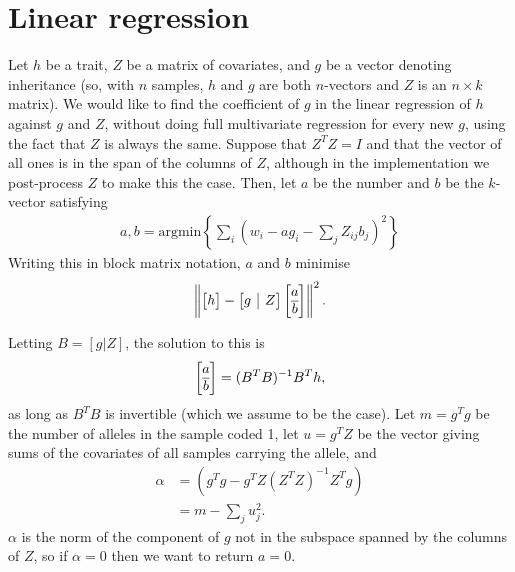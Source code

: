 \documentclass{article}
\begin{document}
\clearpage
\appendix
\setcounter{table}{0}
\renewcommand{\thetable}{S\arabic{table}}
\setcounter{figure}{0}
\renewcommand{\thefigure}{S\arabic{figure}}




\appendix

\section{Linear regression}

Let $h$ be a trait, $Z$ be a matrix of covariates, and $g$ be a vector denoting inheritance
(so, with $n$ samples, $h$ and $g$ are both $n$-vectors and $Z$ is an $n \times k$ matrix).
We would like to find the coefficient of $g$ in the linear regression of $h$ against $g$ and $Z$,
without doing full multivariate regression for every new $g$,
using the fact that $Z$ is always the same.
Suppose that $Z^T Z = I$ and that the vector of all ones is in the span of the columns of $Z$,
although in the implementation we post-process $Z$ to make this the case.
Then, let $a$ be the number and $b$ be the $k$-vector satisfying
\begin{align*}
    a, b = \text{argmin}\left\{ \sum_i \left( w_i - a g_i - \sum_j Z_{ij} b_j \right)^2 \right\}
\end{align*}
Writing this in block matrix notation, $a$ and $b$ minimise
\begin{align*}
    \left\| 
        \left[ \begin{array}{@{}c@{}} h \end{array}\right]
            - 
        \left[ \begin{array}{@{}c|c@{}} g & Z \end{array} \right]
            \left[ \begin{array}{@{}c@{}} a \\ \hline b \end{array} \right]
    \right\|^2 .
\end{align*}


Letting $B = [g | Z]$, the solution to this is
\begin{align*}
    \left[\begin{array}{@{}c@{}}a\\\hline b\end{array}\right] 
        = (B^T B)^{-1} B^T h ,
\end{align*}
as long as $B^T B$ is invertible (which we assume to be the case).
Let $m = g^T g$ be the number of alleles in the sample coded 1,
let $u = g^T Z$ be the vector giving sums of the covariates of all samples carrying the allele,
and
\begin{align*}
    \alpha
    &=
        (g^T g - g^T Z (Z^T Z)^{-1} Z^T g) \\
    &=
        m - \sum_j u_j^2 .
\end{align*}
$\alpha$ is the norm of the component of $g$ not in the subspace spanned by the columns of $Z$,
so if $\alpha = 0$ then we want to return $a=0$.
\end{document}
